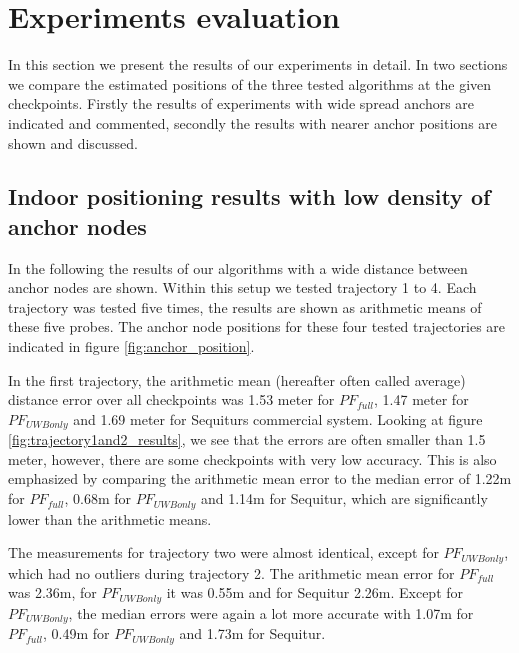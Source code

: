 
\chapter{Experiments evaluation} %

\label{Chapter5} %
In this section we present the results of our experiments in detail. In two sections we compare the estimated positions of the three tested algorithms at the given checkpoints. Firstly the results of experiments with wide spread anchors are indicated and commented, secondly the results with nearer anchor positions are shown and discussed.


\section{Indoor positioning results with low density of anchor nodes}
In the following the results of our algorithms with a wide distance between anchor nodes are shown. Within this setup we tested trajectory 1 to 4. Each trajectory was tested five times, the results are shown as arithmetic means of these five probes. The anchor node positions for these four tested trajectories are indicated in figure \ref{fig:anchor_position}.

In the first trajectory, the arithmetic mean (hereafter often called average) distance error over all checkpoints was 1.53 meter for $PF_{full}$, 1.47 meter for $PF_{UWBonly}$ and 1.69 meter for Sequiturs commercial system. Looking at figure \ref{fig:trajectory1and2_results}, we see that the errors are often smaller than 1.5 meter, however, there are some checkpoints with very low accuracy. This is also emphasized by comparing the arithmetic mean error to the median error of 1.22m for $PF_{full}$, 0.68m for $PF_{UWBonly}$ and 1.14m for Sequitur, which are significantly lower than the arithmetic means.

The measurements for trajectory two were almost identical, except for $PF_{UWBonly}$, which had no outliers during trajectory 2. The arithmetic mean error for $PF_{full}$ was 2.36m, for $PF_{UWBonly}$ it was 0.55m and for Sequitur 2.26m. Except for $PF_{UWBonly}$, the median errors were again a lot more accurate with 1.07m for $PF_{full}$, 0.49m for $PF_{UWBonly}$ and 1.73m for Sequitur.

